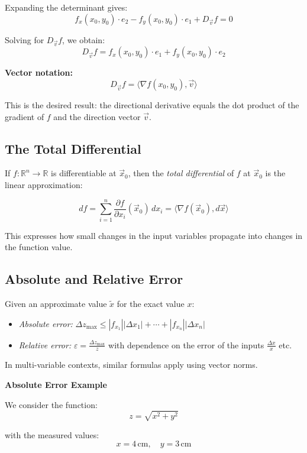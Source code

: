 Expanding the determinant gives:
\[
f_x(x_0, y_0) \cdot e_2 - f_y(x_0, y_0) \cdot e_1 + D_{\vec{v}}f = 0
\]

Solving for \( D_{\vec{v}}f \), we obtain:
\[
D_{\vec{v}}f = f_x(x_0, y_0) \cdot e_1 + f_y(x_0, y_0) \cdot e_2
\]

\textbf{Vector notation:}
\[
D_{\vec{v}}f = \langle \nabla f(x_0, y_0), \vec{v} \rangle
\]

This is the desired result: the directional derivative equals the dot product of the gradient of \( f \) and the direction vector \( \vec{v} \).

\subsection{The Total Differential}

If \( f : \mathbb{R}^n \to \mathbb{R} \) is differentiable at \( \vec{x}_0 \), then the 
\emph{total differential} of \( f \) at \( \vec{x}_0 \) is the linear approximation:

\[
df = \sum_{i=1}^n \frac{\partial f}{\partial x_i}(\vec{x}_0) \, dx_i = \langle \nabla f(\vec{x}_0), d\vec{x} \rangle
\]

This expresses how small changes in the input variables propagate into changes in the function value.


\subsection{Absolute and Relative Error}

Given an approximate value \( \tilde{x} \) for the exact value \( x \):

\begin{itemize}[label=\(-\)]
\item \emph{Absolute error:} \(\Delta z_{\max} \le |f_{x_1}||\Delta x_1| + \cdots + |f_{x_n}||\Delta x_n| \)
\item \emph{Relative error:} \( \varepsilon = \frac{\Delta z_{\max}}{z}\) with dependence on the error of the inputs \(\frac{\Delta x}{x}\) etc.
\end{itemize}

In multi-variable contexts, similar formulas apply using vector norms.

\textbf{Absolute Error Example}

We consider the function:
\[
z = \sqrt{x^2 + y^2}
\]

with the measured values:
\[
x = 4 \, \text{cm}, \quad y = 3 \, \text{cm}
\]


